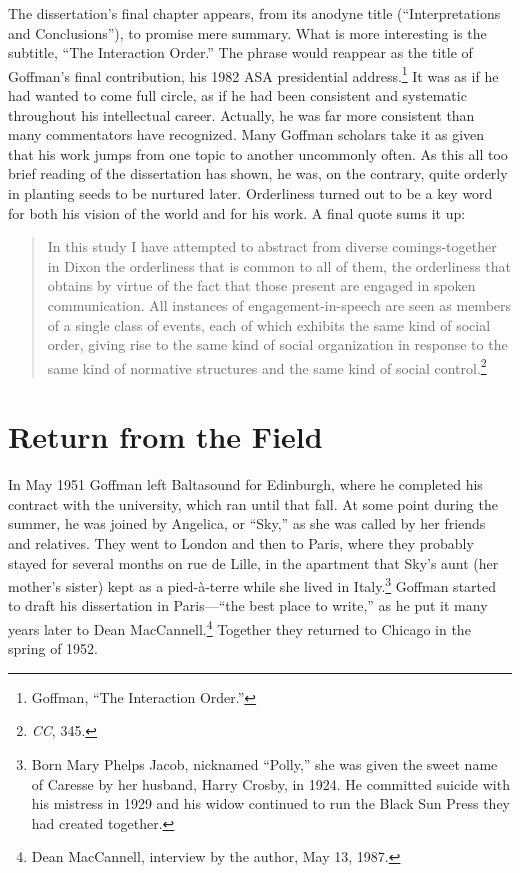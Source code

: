 \documentclass[openany,nobib]{tufte-book}
\begin{document}
The dissertation's final chapter appears, from its anodyne title
(``Interpretations and Conclusions''), to promise mere summary. What is
more interesting is the subtitle, ``The Interaction Order.'' The phrase
would reappear as the title of Goffman's final contribution, his 1982
ASA presidential address.\footnote{Goffman, ``The Interaction Order.''}
It was as if he had wanted to come full circle, as if he had been
consistent and systematic throughout his intellectual career. Actually,
he was far more consistent than many commentators have recognized. Many
Goffman scholars take it as given that his work jumps from one topic to
another uncommonly often. As this all too brief reading of the
dissertation has shown, he was, on the contrary, quite orderly in
planting seeds to be nurtured later. Orderliness turned out to be a key
word for both his vision of the world and for his work. A final quote
sums it up:

\begin{quote}
In this study I have attempted to abstract from diverse comings-together
in Dixon the orderliness that is common to all of them, the orderliness
that obtains by virtue of the fact that those present are engaged in
spoken communication. All instances of engagement-in-speech are seen as
members of a single class of events, each of which exhibits the same
kind of social order, giving rise to the same kind of social
organization in response to the same kind of normative structures and
the same kind of social control.\footnote{\emph{CC}, 345.}
\end{quote}

\hypertarget{return-from-the-field}{%
\section{Return from the Field}\label{return-from-the-field}}

In May 1951 Goffman left Baltasound for Edinburgh, where he completed
his contract with the university, which ran until that fall. At some
point during the summer, he was joined by Angelica, or ``Sky,'' as she
was called by her friends and relatives. They went to London and then to
Paris, where they probably stayed for several months on rue de Lille, in
the apartment that Sky's aunt (her mother's sister) kept as a
pied-à-terre while she lived in Italy.\footnote{Born Mary Phelps Jacob,
  nicknamed ``Polly,'' she was given the sweet name of Caresse by her
  husband, Harry Crosby, in 1924. He committed suicide with his mistress
  in 1929 and his widow continued to run the Black Sun Press they had
  created together.} Goffman started to draft his dissertation in
Paris---``the best place to write,'' as he put it many years later to
Dean MacCannell.\footnote{Dean MacCannell, interview by the author, May
  13, 1987.} Together they returned to Chicago in the spring of 1952.
\end{document}
